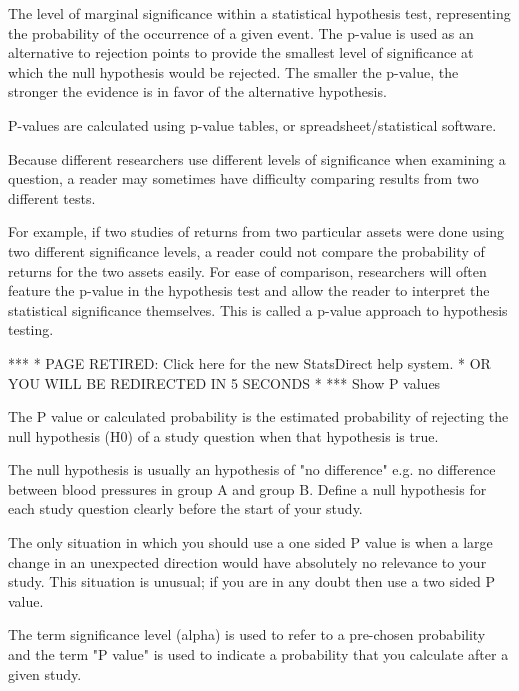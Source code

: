 The level of marginal significance within a statistical hypothesis test, representing the probability of the occurrence of a given event. The p-value is used as an alternative to rejection points to provide the smallest level of significance at which the null hypothesis would be rejected. The smaller the p-value, the stronger the evidence is in favor of the alternative hypothesis.

P-values are calculated using p-value tables, or spreadsheet/statistical software.


Because different researchers use different levels of significance when examining a question, a reader may sometimes have difficulty comparing results from two different tests. 

For example, if two studies of returns from two particular assets were done using two different significance levels, a reader could not compare the probability of returns for the two assets easily. For ease of comparison, researchers will often feature the p-value in the hypothesis test and allow the reader to interpret the statistical significance themselves. This is called a p-value approach to hypothesis testing. 


***
*
PAGE RETIRED: Click here for the new StatsDirect help system.
*
OR YOU WILL BE REDIRECTED IN 5 SECONDS
*
***
Show 
P values
 
The P value or calculated probability is the estimated probability of rejecting the null hypothesis (H0) of a study question when that hypothesis is true.
 
The null hypothesis is usually an hypothesis of "no difference" e.g. no difference between blood pressures in group A and group B. Define a null hypothesis for each study question clearly before the start of your study.
 
The only situation in which you should use a one sided P value is when a large change in an unexpected direction would have absolutely no relevance to your study. This situation is unusual; if you are in any doubt then use a two sided P value.
 
The term significance level (alpha) is used to refer to a pre-chosen probability and the term "P value" is used to indicate a probability that you calculate after a given study.
 
